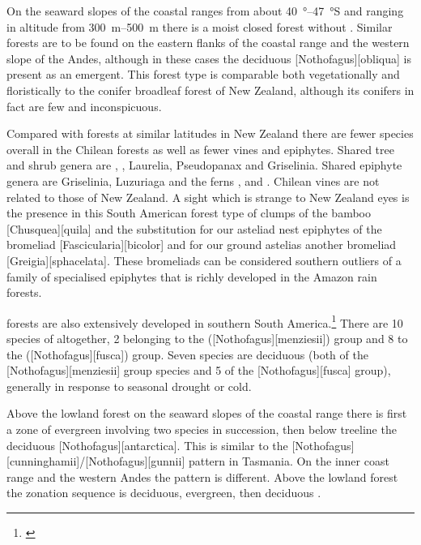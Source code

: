 On the seaward slopes of the coastal ranges from about \SIrange{40}{47}{\degree}S and ranging in altitude from \SIrange{300}{500}{\metre} there is a moist closed forest without .
Similar forests are to be found on the eastern flanks of the coastal range and the western slope of the Andes, although in these cases the deciduous [Nothofagus][obliqua] is present as an emergent.
This forest type is comparable both vegetationally and floristically to the conifer broadleaf forest of New Zealand, although its conifers in fact are few and inconspicuous.

Compared with forests at similar latitudes in New Zealand there are fewer species overall in the Chilean forests as well as fewer vines and epiphytes.
Shared tree and shrub genera are , , Laurelia, Pseudopanax and Griselinia.
Shared epiphyte genera are Griselinia, Luzuriaga and the ferns ,  and .
Chilean vines are not related to those of New Zealand.
A sight which is strange to New Zealand eyes is the presence in this South American forest type of clumps of the bamboo [Chusquea][quila] and the substitution for our asteliad nest epiphytes of the bromeliad [Fascicularia][bicolor] and for our ground astelias another bromeliad [Greigia][sphacelata].
These bromeliads can be considered southern outliers of a family of specialised epiphytes that is richly developed in the Amazon rain forests.

 forests are also extensively developed in southern South America.\footnote{\cite{mcqueen1976ecology}}
There are 10 species of  altogether, 2 belonging to the  ([Nothofagus][menziesii]) group and 8 to the  ([Nothofagus][fusca]) group.
Seven species are deciduous (both of the [Nothofagus][menziesii] group species and 5 of the [Nothofagus][fusca] group), generally in response to seasonal drought or cold.

Above the lowland forest on the seaward slopes of the coastal range there is first a zone of evergreen  involving two species in succession, then below treeline the deciduous [Nothofagus][antarctica].
This is similar to the [Nothofagus][cunninghamii]/[Nothofagus][gunnii] pattern in Tasmania.
On the inner coast range and the western Andes the pattern is different.
Above the lowland forest the zonation sequence is deciduous, evergreen, then deciduous .

